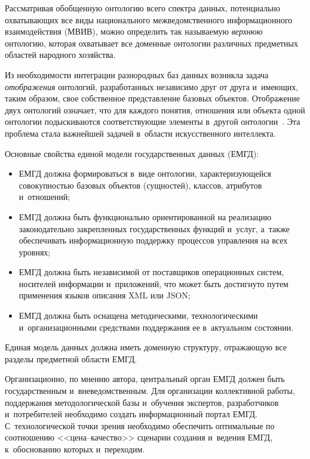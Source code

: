 \begin{multicols}{2}
Рассматривая обобщенную онтологию всего спект\-ра данных, потенциально 
охва\-ты\-ва\-ющих все виды национального межведомственного 
информационного взаимодействия (МВИВ), можно определить так 
на\-зы\-ва\-емую \textit{верхнюю} онтологию, которая охватывает все доменные 
онтологии различных пред\-мет\-ных областей народного хозяйства. 

Из необходимости интеграции разнородных баз данных возникла задача 
\textit{отображения} онтологий, разработанных независимо друг от друга 
и~име\-ющих, таким образом, свое собственное пред\-став\-ле\-ние базовых 
объектов. Отображение двух онтологий означает, что для каж\-до\-го понятия, 
отношения или объекта одной онтологии подыскиваются со\-от\-вет\-ст\-ву\-ющие 
элементы в~другой онтологии~\cite{10-suc}. Эта проб\-ле\-ма стала важнейшей 
задачей в~об\-ласти искусственного интеллекта.

Основные свойства единой модели государственных данных (ЕМГД): 
\begin{itemize}
\item ЕМГД должна формироваться в~виде онтологии, характеризующейся 
со\-во\-куп\-ностью базовых объектов (сущностей), классов, атрибутов 
и~отношений;
\item ЕМГД должна быть функционально ориентированной на реализацию 
законодательно закрепленных государственных функций и~услуг, а~так\-же 
обеспечивать информационную поддержку процессов управ\-ле\-ния на всех 
уровнях;
\item ЕМГД должна быть независимой от поставщиков операционных 
сис\-тем, носителей информации и~приложений, что может быть достигнуто 
путем применения языков описания XML или JSON;
\item ЕМГД должна быть оснащена методическими, технологическими 
и~организационными средствами поддержания ее в~актуальном со\-сто\-янии.
\end{itemize}

Единая модель данных должна иметь доменную структуру, отра\-жа\-ющую все 
разделы пред\-мет\-ной об\-ласти ЕМГД.

Организационно, по мнению автора, центральный орган ЕМГД должен быть 
государственным и~вневедомственным. Для организации коллективной 
работы, поддержания методологической базы и~обучения экспертов, 
разработчиков и~потребителей необходимо создать информационный портал 
ЕМГД. С~технологической точ\-ки зрения необходимо обеспечить 
оптимальные по соотношению <<це\-на--ка\-чест\-во>> сценарии создания 
и~ведения ЕМГД, к~обоснованию которых и~переходим.


\end{multicols}
